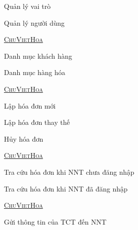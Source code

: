 
Quản lý vai trò

Quản lý người dùng

\underline{\textsc{ChuVietHoa}}


Danh mục khách hàng

Danh mục hàng hóa

\underline{\textsc{ChuVietHoa}}


Lập hóa đơn mới

Lập hóa đơn thay thế

Hủy hóa đơn

\underline{\textsc{ChuVietHoa}}


Tra cứu hóa đơn khi NNT chưa đăng nhập

Tra cứu hóa đơn khi NNT đã đăng nhập

\underline{\textsc{ChuVietHoa}}

Gửi thông tin của TCT đến NNT
